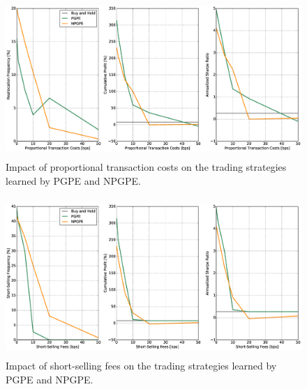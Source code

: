 \begin{figure}[t!]
	\centering
	\includegraphics[height=6cm,width=1.0\textwidth]{Images/6_2_impact_transaction_costs}
	\caption[Impact of proportional transaction costs]{Impact of proportional transaction costs on the trading strategies learned by PGPE and NPGPE.}
	\label{fig:impact_transaction_costs}
\end{figure}

\begin{figure}[t!]
	\centering
	\includegraphics[height=6cm,width=1.0\textwidth]{Images/6_3_impact_short_selling_fees}
	\caption[Impact of short-selling fees]{Impact of short-selling fees on the trading strategies learned by PGPE and NPGPE.}
	\label{fig:impact_short_selling_fees}
\end{figure}